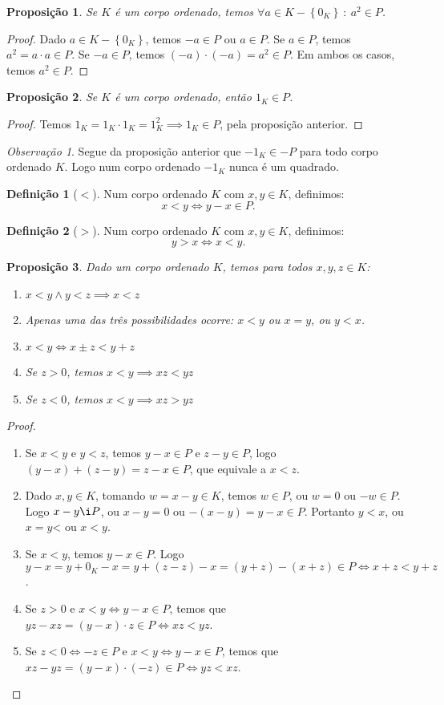 \documentclass{article}
\newtheorem{prop}{Proposição}[section]
\theoremstyle{theorem}
\theoremstyle{lemma}
\theoremstyle{definition}
\newtheorem{definicao}{Definição}[section]
\theoremstyle{remark}
\newtheorem{obs}{Observação}[section]
\begin{document}
\begin{prop}
	Se $K$ é um corpo ordenado, temos $ \forall a\in K-\left\{0_K\right\}  \: : \: a^2 \in P$.
\end{prop}
\begin{proof}
	Dado $a\in K-\left\{0_K\right\}$, temos $-a \in P$  ou $a\in P$.  Se $a\in P$, temos $a^2 = a\cdot a \in P$. Se $-a\in P$, temos $(-a)\cdot (-a) = a^2 \in P$. Em ambos os casos, temos $a^2\in P$.
\end{proof}
\begin{prop}
	Se $K$ é um corpo ordenado, então $1_K \in P$.
\end{prop}
\begin{proof}
	Temos $1_K = 1_K \cdot 1_K  = 1_K^2 \implies 1_K \in P$, pela proposição anterior.
\end{proof}
\begin{obs}
	Segue da proposição anterior que $-1_K\in -P$ para todo corpo ordenado $K$. Logo num corpo ordenado $-1_K$ nunca é um quadrado.
\end{obs}
\begin{definicao}[$<$]
	Num corpo ordenado $K$ com $x,y \in K$, definimos:
	$$ x< y \iff y - x \in P.$$
\end{definicao}
\begin{definicao}[$>$]
	Num corpo ordenado $K$ com $x,y \in K$, definimos:
	$$ y> x \iff x < y.$$
\end{definicao}
\begin{prop}
	Dado um corpo ordenado $K$, temos para todos $x,y,z\in K$:
	\begin{enumerate}
		\item $ x <y \land y < z \implies x< z$
		\item Apenas uma das três possibilidades ocorre: $x < y$ ou $x = y$, ou $y < x$.
		\item $x < y \iff x\pm z < y+z$
		\item Se $z>0$, temos $ x< y \implies xz < yz$
		\item Se $z<0$, temos $ x< y \implies xz > yz$
	\end{enumerate}
\end{prop}
\begin{proof}
	\begin{enumerate}
		\item Se $x<y$  e $y<z$, temos $y-x\in P$ e $z-y \in P$, logo $(y-x) +(z-y) = z-x \in P$, que equivale a $x<z$.
		\item Dado $x,y\in K$, tomando $w = x-y \in K$, temos $w \in P$, ou $w = 0$ ou $-w \in P$. Logo $x-y \i P$, ou $x-y = 0$ ou $-(x-y) = y-x \in P$. Portanto $y <x$, ou $x = y$< ou $x<y$.
		\item Se $x<y$, temos $y-x\in P$. Logo $y-x = y+0_K -x  = y +(z-z) -x = (y+z) -(x+z) \in P \iff x+z < y +z$.
		\item Se $z>0$ e $x<y \iff y-x\in P$, temos que $ yz - xz = (y-x)\cdot z \in P \iff xz<yz$.
		\item Se $z<0 \iff -z \in P$ e $x<y \iff y-x\in P$, temos que $  xz - yz = (y-x)\cdot (-z) \in P \iff yz<xz$.
	\end{enumerate}
\end{proof}
\end{document}
